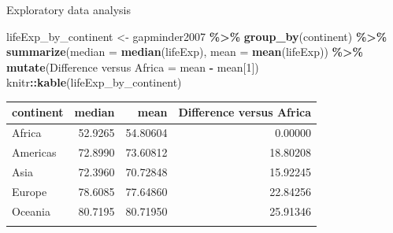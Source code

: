\documentclass[
  ignorenonframetext,
]{beamer}
\newenvironment{Shaded}{\begin{snugshade}}{\end{snugshade}}
\newcommand{\AttributeTok}[1]{\textcolor[rgb]{0.13,0.29,0.53}{#1}}
\newcommand{\DecValTok}[1]{\textcolor[rgb]{0.00,0.00,0.81}{#1}}
\newcommand{\FunctionTok}[1]{\textcolor[rgb]{0.13,0.29,0.53}{\textbf{#1}}}
\newcommand{\NormalTok}[1]{#1}
\newcommand{\OtherTok}[1]{\textcolor[rgb]{0.56,0.35,0.01}{#1}}
\newcommand{\SpecialCharTok}[1]{\textcolor[rgb]{0.81,0.36,0.00}{\textbf{#1}}}
\newcommand{\StringTok}[1]{\textcolor[rgb]{0.31,0.60,0.02}{#1}}
\begin{document}
\begin{frame}[fragile]{Exploratory data analysis}
\protect\hypertarget{exploratory-data-analysis-7}{}
\normalsize

\begin{Shaded}
\begin{Highlighting}[]
\NormalTok{lifeExp\_by\_continent }\OtherTok{\textless{}{-}}\NormalTok{ gapminder2007 }\SpecialCharTok{\%\textgreater{}\%}
  \FunctionTok{group\_by}\NormalTok{(continent) }\SpecialCharTok{\%\textgreater{}\%}
  \FunctionTok{summarize}\NormalTok{(}\AttributeTok{median =} \FunctionTok{median}\NormalTok{(lifeExp), }
            \AttributeTok{mean =} \FunctionTok{mean}\NormalTok{(lifeExp)) }\SpecialCharTok{\%\textgreater{}\%} 
  \FunctionTok{mutate}\NormalTok{(}\StringTok{\textasciigrave{}}\AttributeTok{Difference versus Africa}\StringTok{\textasciigrave{}} \OtherTok{=}\NormalTok{ mean }\SpecialCharTok{{-}}\NormalTok{ mean[}\DecValTok{1}\NormalTok{])}
\NormalTok{knitr}\SpecialCharTok{::}\FunctionTok{kable}\NormalTok{(lifeExp\_by\_continent)}
\end{Highlighting}
\end{Shaded}

\begin{longtable}[]{@{}lrrr@{}}
\toprule\noalign{}
continent & median & mean & Difference versus Africa \\
\midrule\noalign{}
\endhead
Africa & 52.9265 & 54.80604 & 0.00000 \\
Americas & 72.8990 & 73.60812 & 18.80208 \\
Asia & 72.3960 & 70.72848 & 15.92245 \\
Europe & 78.6085 & 77.64860 & 22.84256 \\
Oceania & 80.7195 & 80.71950 & 25.91346 \\
\bottomrule\noalign{}
\end{longtable}

\normalsize
\end{frame}
\end{document}
